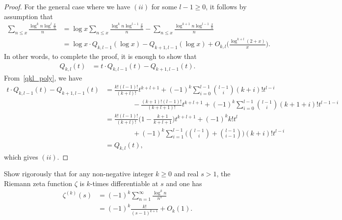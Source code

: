 \documentclass[11pt]{article}
\newenvironment{ex}[1]
  {\renewcommand\theinnercustomthm{#1}\innercustomthm}
  {\endinnercustomthm}
\begin{document}
\begin{proof}
For the general case where we have $(ii)$ for some $l-1\geq 0$, it follows by assumption that
\begin{align*}
\sum_{n\leq x}\frac{\log^k{n}\log^l{\frac{x}{n}}}{n} &= \log{x}\sum_{n\leq x}\frac{\log^k{n}\log^{l-1}{\frac{x}{n}}}{n} -\sum_{n\leq x}\frac{\log^{k+1}{n}\log^{l-1}{\frac{x}{n}}}{n}\\
&= \log{x}\cdot Q_{k,l-1}(\log{x})-Q_{k+1,l-1}(\log{x})+O_{k,l}\bigg(\frac{\log^{k+l}(2+x)}{x}\bigg).
\end{align*}
In other words, to complete the proof, it is enough to show that
\begin{align*}
Q_{k,l}(t) &= t\cdot Q_{k,l-1}(t)-Q_{k+1,l-1}(t).
\end{align*}
From~\eqref{qkl_poly}, we have
\begin{align*}
t\cdot Q_{k,l-1}(t)-Q_{k+1,l-1}(t) &= \frac{k!(l-1)!}{(k+l)!}t^{k+l+1}+(-1)^k\sum_{i=0}^{l-1}\binom{l-1}{i}(k+i)!t^{l-i}\\
& \qquad\qquad -\frac{(k+1)!(l-1)!}{(k+l+1)!}t^{k+l+1}+(-1)^k\sum_{i=0}^{l-1}\binom{l-1}{i}(k+1+i)!t^{l-1-i}\\
&= \frac{k!(l-1)!}{(k+l)!}\bigg(1-\frac{k+1}{k+l+1}\bigg)t^{k+l+1}+(-1)^kk!t^l\\
& \qquad\qquad +(-1)^k\sum_{i=1}^{l-1}\bigg(\binom{l-1}{i}+\binom{l-1}{i-1}\bigg)(k+i)!t^{l-i}\\
&= Q_{k,l}(t),
\end{align*}
which gives $(ii)$.
\end{proof}


\begin{ex}{10}\label{ten}
Show rigorously that for any non-negative integer $k\geq 0$ and real $s>1$, the Riemann zeta function $\zeta$ is $k$-times differentiable at $s$ and one has
\begin{align}
\zeta^{(k)}(s) &= (-1)^k\sum_{n=1}^\infty\frac{\log^k{n}}{n^s}\label{zeta_deriv}\\
&= (-1)^k\frac{k!}{(s-1)^{k+1}}+O_k(1).\label{zeta_deriv_2}
\end{align}
\end{ex}
\end{document}
